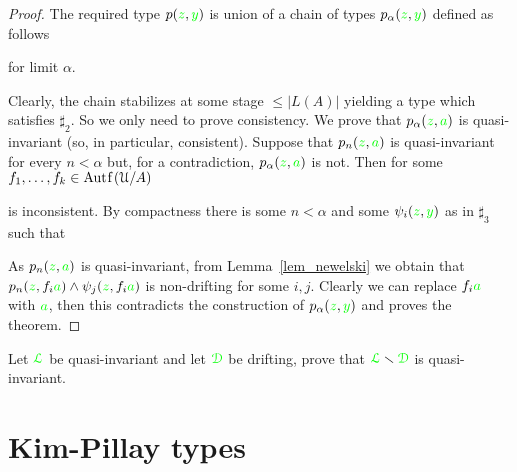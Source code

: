 \documentclass[creche.tex]{subfiles}
\begin{document}
\begin{proof}
The required type $p({\color{green} z},{\color{green} y})$ is union of a chain of types $p_\alpha({\color{green} z},{\color{green} y})$ defined as follows\smallskip

\smallskip


\quad for limit $\alpha$.

\noindent Clearly, the chain stabilizes at some stage $\le|L(A)|$ yielding a type which satisfies $\sharp_2$. So we only need to prove consistency. We prove that $p_\alpha({\color{green} z},{\color{green} a})$ is quasi-invariant (so, in particular, consistent). Suppose that $p_n({\color{green} z},{\color{green} a})$ is quasi-invariant for every $n<\alpha$ but, for a contradiction, $p_\alpha({\color{green} z},{\color{green} a})$ is not. Then for some $f_1,\dots,f_k\in\mathord{\rm Aut\kern.15ex{f}\kern.15ex}(\EuScript U/A)$


\noindent is inconsistent. By compactness there is some $n<\alpha$ and some $\psi_i({\color{green} z},{\color{green} y})$ as in $\sharp_3$ such that


As $p_n({\color{green} z},{\color{green} a})$ is quasi-invariant, from Lemma~\ref{lem_newelski} we obtain that $p_n({\color{green} z},f_i{\color{green} a})\wedge\psi_j({\color{green} z},f_i{\color{green} a})$ is non-drifting for some $i,j$. Clearly we can replace $f_i{\color{green} a}$ with ${\color{green} a}$, then this contradicts the construction of $p_\alpha({\color{green} z},{\color{green} y})$ and proves the theorem.
\end{proof}

\begin{exercise}
Let ${\color{green}\EuScript L}$ be quasi-invariant and let ${\color{green}\EuScript D}$ be drifting, prove that  ${\color{green}\EuScript L}\smallsetminus{\color{green}\EuScript D}$ is quasi-invariant.\QED
\end{exercise}

\section{Kim-Pillay types}\label{KPtypes}
\end{document}
